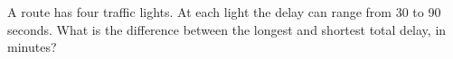 A route has four traffic lights. At each light the delay can range from 30 to 90 seconds. What is the difference between the longest and shortest total delay, in minutes?

